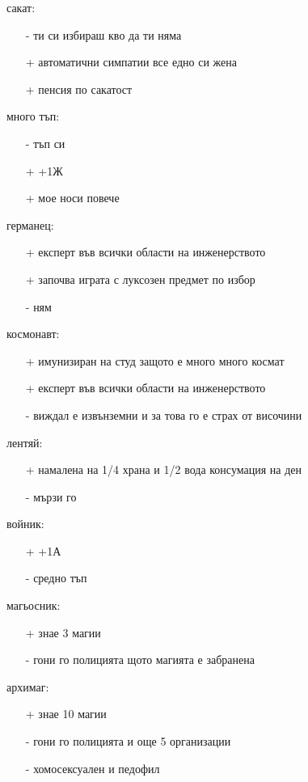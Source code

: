 \documentclass{article}
\begin{document}
сакат:
\begin{itemize}
\item[-] ти си избираш кво да ти няма
\item[+] автоматични симпатии все едно си жена
\item[+] пенсия по сакатост
\end{itemize}

много тъп:
\begin{itemize}
\item[-] тъп си
\item[+] +1Ж
\item[+] мое носи повече
\end{itemize}

германец:
\begin{itemize}
\item[+] експерт във всички области на инженерството
\item[+] започва играта с луксозен предмет по избор
\item[-] ням
\end{itemize}

космонавт:
\begin{itemize}
\item[+] имунизиран на студ защото е много много космат
\item[+] експерт във всички области на инженерството
\item[-] виждал е извънземни и за това го е страх от височини
\end{itemize}

лентяй:
\begin{itemize}
\item[+] намалена на 1/4 храна и 1/2 вода консумация на ден
\item[-] мързи го
\end{itemize}

войник:
\begin{itemize}
\item[+] +1А
\item[-] средно тъп
\end{itemize}

магьосник:
\begin{itemize}
\item[+] знае 3 магии
\item[-] гони го полицията щото магията е забранена
\end{itemize}

архимаг:
\begin{itemize}
\item[+] знае 10 магии
\item[-] гони го полицията и още 5 организации
\item[-] хомосексуален и педофил
\end{itemize}
\end{document}
